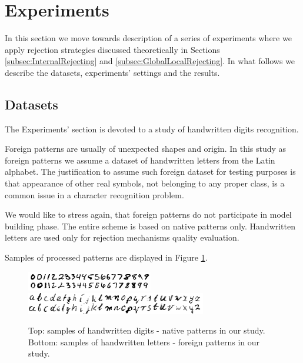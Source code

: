 \documentclass{llncs}
\begin{document}
\section{Experiments}
  \label{sec:Experiments}

In this section we move towards description of a series of experiments where we apply rejection strategies discussed theoretically in Sections \ref{subsec:InternalRejecting} and \ref{subsec:GlobalLocalRejecting}. In what follows we describe the datasets, experiments' settings and the results. 

\subsection{Datasets}

The Experiments' section is devoted to a study of handwritten digits recognition. 

Foreign patterns are usually of unexpected shapes and origin. In this study as foreign patterns we assume a dataset of handwritten letters from the Latin alphabet. The justification to assume such foreign dataset for testing purposes is that appearance of other real symbols, not belonging to any proper class, is a common issue in a character recognition problem. 

We would like to stress again, that foreign patterns do not participate in model building phase. The entire scheme is based on native patterns only. Handwritten letters are used only for rejection mechanisms quality evaluation.

Samples of processed patterns are displayed in Figure \ref{fig:nativeforeignpatterns}.

\begin{figure}[!htbp]
  \centering
  \includegraphics[width=0.49\textwidth]{_Figures/natives}\\
  \includegraphics[width=0.7\textwidth]{_Figures/foreigns}
  \caption{Top: samples of handwritten digits - native patterns in our study. Bottom: samples of handwritten letters - foreign patterns in our study.}
\label{fig:nativeforeignpatterns}
\end{figure}
\end{document}
